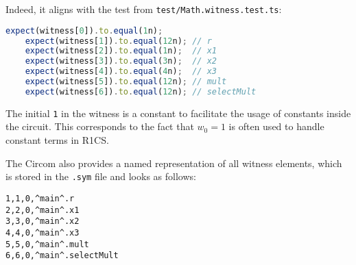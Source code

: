 \documentclass[../lecture-notes.tex]{subfiles}
\begin{document}
    Indeed, it aligns with the test from \texttt{test/Math.witness.test.ts}:

    \newpage

    \begin{center}
        \begin{tcolorbox}[enhanced,
            width=0.75\textwidth,
            title={\textbf{test/Math.witness.test.ts}},
            coltitle=gray!25!black,
            attach boxed title to top center={yshift=-2mm,yshifttext=-1mm},
            boxed title style={size=small,colframe=gray!75!black,
            colback=Green!30!white,boxrule=1pt},
            top=-0.3cm,
            bottom=-0.3cm]
            \begin{lstlisting}[language=TypeScript,numbers=none,basicstyle=\ttfamily\footnotesize]
    expect(witness[0]).to.equal(1n);
    expect(witness[1]).to.equal(12n); // r
    expect(witness[2]).to.equal(1n);  // x1
    expect(witness[3]).to.equal(3n);  // x2
    expect(witness[4]).to.equal(4n);  // x3
    expect(witness[5]).to.equal(12n); // mult
    expect(witness[6]).to.equal(12n); // selectMult
            \end{lstlisting}
        \end{tcolorbox}
    \end{center}

    The initial \texttt{1} in the witness is a constant to facilitate the usage of constants inside the circuit.
    This corresponds to the fact that $w_0=1$ is often used to handle constant terms in R1CS.

    The Circom also provides a named representation of all witness elements, which is stored in the \texttt{.sym} file and looks as follows:

    \begin{center}
        \begin{tcolorbox}[enhanced,
            width=0.5\textwidth,
            title=\textbf{.sym file for $x_1? \; x_2 \times x_3: x_2+x_3$},
            coltitle=gray!25!black,
            attach boxed title to top center={yshift=-2mm,yshifttext=-1mm},
            boxed title style={size=small,colframe=gray!75!black,
            colback=blue!30!white,boxrule=1pt},
            top=-0.35cm,
            bottom=-0.35cm]
            \begin{lstlisting}[language=Circom,numbers=none,basicstyle=\ttfamily\footnotesize,escapechar=^]
1,1,0,^main^.r
2,2,0,^main^.x1
3,3,0,^main^.x2
4,4,0,^main^.x3
5,5,0,^main^.mult
6,6,0,^main^.selectMult
            \end{lstlisting}
        \end{tcolorbox}
    \end{center}
\end{document}
